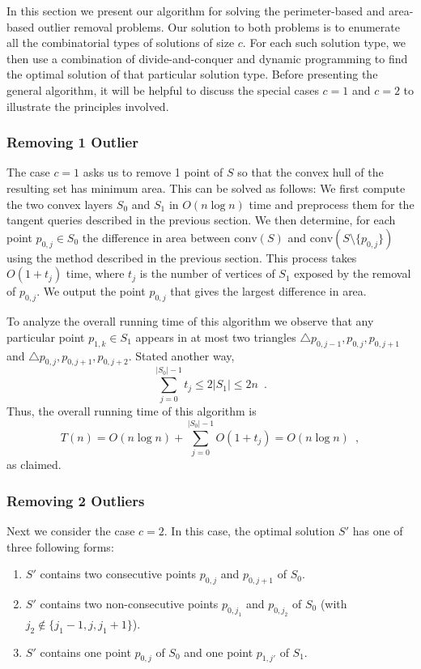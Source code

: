\documentclass[lotsofwhite]{patmorin}
\newcommand{\ch}{\mathrm{conv}}
\begin{document}
In this section we present our algorithm for solving the
perimeter-based and area-based outlier removal problems. Our solution
to both problems is to enumerate all the combinatorial types of
solutions of size $c$.  For each such solution type, we then use a
combination of divide-and-conquer and dynamic programming to find the
optimal solution of that particular solution type.  Before presenting
the general algorithm, it will be helpful to discuss the special cases
$c=1$ and $c=2$ to illustrate the principles involved.

\subsubsection{Removing 1 Outlier}

The case $c=1$ asks us to remove 1 point of $S$ so that the convex
hull of the resulting set has minimum area.  This can be solved as
follows: We first compute the two convex layers $S_0$ and $S_1$ in
$O(n\log n)$ time and preprocess them for the tangent queries
described in the previous section.  We then determine, for each point
$p_{0,j}\in S_0$ the difference in area between $\ch(S)$ and
$\ch(S\setminus\{p_{0,j}\})$ using the method described in the
previous section.  This process takes $O(1+t_j)$ time, where $t_j$ is
the number of vertices of $S_1$ exposed by the removal of $p_{0,j}$.
We output the point $p_{0,j}$ that gives the largest difference in
area.

To analyze the overall running time of this algorithm we observe that
any particular point $p_{1,k}\in S_1$ appears in at most two triangles
$\triangle p_{0,j-1},p_{0,j},p_{0,j+1}$ and
$\triangle p_{0,j},p_{0,j+1},p_{0,j+2}$.  Stated another way,
\[
     \sum_{j=0}^{|S_0|-1} t_j \le 2|S_1|\le 2n \enspace .
\]
Thus, the overall running time of this algorithm is
\[
     T(n) = O(n\log n)+\sum_{j=0}^{|S_0|-1} O(1+t_j) = O(n\log n) \enspace ,
\]
as claimed.

\subsubsection{Removing 2 Outliers}

Next we consider the case $c=2$.  In this case, the optimal solution
$S'$ has one of three following forms:

\begin{enumerate}

\item $S'$ contains two consecutive points $p_{0,j}$ and $p_{0,j+1}$
of $S_0$.

\item $S'$ contains two non-consecutive points $p_{0,j_1}$ and
$p_{0,j_2}$ of $S_0$ (with $j_2\not\in\{j_1-1,j,j_1+1\}$).

\item $S'$ contains one point $p_{0,j}$ of $S_0$ and one point
$p_{1,j'}$ of $S_1$.

\end{enumerate}
\end{document}

